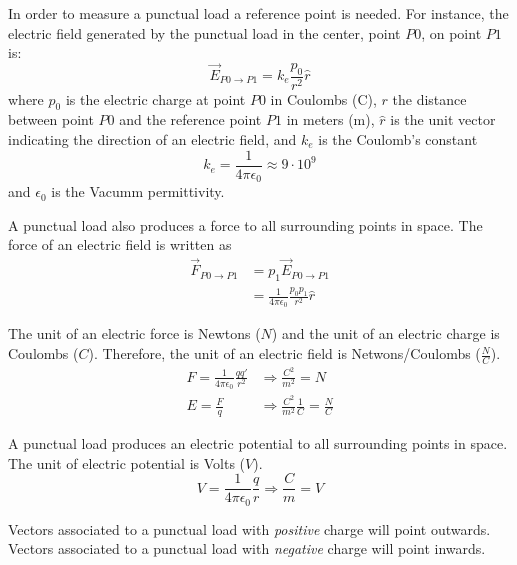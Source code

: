 \documentclass{article}
\begin{document}
In order to measure a punctual load a reference point is needed. For instance, the electric field generated by the punctual load in the center, point $P0$, on point $P1$ is:
\[
	\vec{E}_{P0 \to P1} = k_e\frac{p_0}{r^2}\hat{r}
\]
where $p_0$ is the electric charge at point $P0$ in Coulombs (C), $r$ the
distance between point $P0$ and the reference point $P1$ in meters (m), $\hat{r}$ is the unit vector
indicating the direction of an electric field, and $k_e$ is the Coulomb's constant
\[
	k_e = \frac{1}{4 \pi \epsilon_0} \approx 9 \cdot 10^9
\]
and $\epsilon_0$ is the Vacumm permittivity.

A punctual load also produces a force to all surrounding points in space. The force of an electric
field is written as
\begin{align*}
	\vec{F}_{P0 \to P1} &= p_1 \vec{E}_{P0 \to P1}\\
						&= \frac{1}{4 \pi \epsilon_0} \frac{p_0 p_1}{r^2}\hat{r}
\end{align*}

The unit of an electric force is Newtons ($N$) and the unit of an electric charge is Coulombs ($C$).
Therefore, the unit of an electric field is Netwons/Coulombs ($\frac{N}{C}$).
\begin{align*}
	F = \frac{1}{4 \pi \epsilon_0}\frac{q q'}{r^2} &\Longrightarrow \frac{C^2}{m^2} = N\\
	E = \frac{F}{q} &\Longrightarrow \frac{C^2}{m^2}\frac{1}{C} = \frac{N}{C}
\end{align*}

A punctual load produces an electric potential to all surrounding points in space. The unit of electric potential is Volts ($V$).
\[
	V = \frac{1}{4\pi \epsilon_0}\frac{q}{r} \Longrightarrow \frac{C}{m} = V
\]

\pagebreak
Vectors associated to a punctual load with \emph{positive} charge will point outwards. Vectors
associated to a punctual load with \emph{negative} charge will point inwards.
\end{document}
